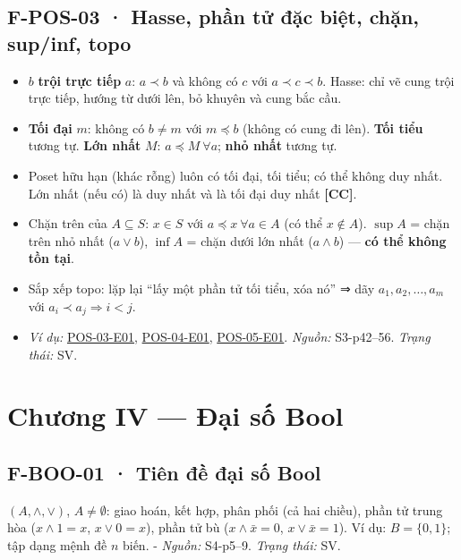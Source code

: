 \documentclass[
  10pt,
  twoside,openany]{book}
\providecommand{\tightlist}{%
  \setlength{\itemsep}{0pt}\setlength{\parskip}{0pt}}
\begin{document}
\hypertarget{F-POS-03}{%
\subsection{F-POS-03 · Hasse, phần tử đặc biệt, chặn, sup/inf,
topo}\label{F-POS-03}}

\begin{itemize}
\tightlist
\item
  \(b\) \textbf{trội trực tiếp} \(a\): \(a\prec b\) và không có \(c\)
  với \(a\prec c\prec b\). Hasse: chỉ vẽ cung trội trực tiếp, hướng từ
  dưới lên, bỏ khuyên và cung bắc cầu.
\item
  \textbf{Tối đại} \(m\): không có \(b\ne m\) với \(m\preceq b\) (không
  có cung đi lên). \textbf{Tối tiểu} tương tự. \textbf{Lớn nhất} \(M\):
  \(a\preceq M\ \forall a\); \textbf{nhỏ nhất} tương tự.
\item
  Poset hữu hạn (khác rỗng) luôn có tối đại, tối tiểu; có thể không duy
  nhất. Lớn nhất (nếu có) là duy nhất và là tối đại duy nhất
  \textbf{{[}CC{]}}.
\item
  Chặn trên của \(A\subseteq S\): \(x\in S\) với
  \(a\preceq x\ \forall a\in A\) (có thể \(x\notin A\)). \(\sup A\) =
  chặn trên nhỏ nhất (\(a\vee b\)), \(\inf A\) = chặn dưới lớn nhất
  (\(a\wedge b\)) --- \textbf{có thể không tồn tại}.
\item
  Sắp xếp topo: lặp lại ``lấy một phần tử tối tiểu, xóa nó'' ⇒ dãy
  \(a_1,a_2,\dots,a_m\) với \(a_i\prec a_j\Rightarrow i<j\).
\item
  \emph{Ví dụ:} \protect\hyperlink{POS-03-E01}{POS-03-E01},
  \protect\hyperlink{POS-04-E01}{POS-04-E01},
  \protect\hyperlink{POS-05-E01}{POS-05-E01}. \emph{Nguồn:} S3-p42--56.
  \emph{Trạng thái:} SV.
\end{itemize}

\hypertarget{chux1b0ux1a1ng-iv-ux111ux1ea1i-sux1ed1-bool-1}{%
\section{Chương IV --- Đại số
Bool}\label{chux1b0ux1a1ng-iv-ux111ux1ea1i-sux1ed1-bool-1}}

\hypertarget{F-BOO-01}{%
\subsection{F-BOO-01 · Tiên đề đại số Bool}\label{F-BOO-01}}

\((A,\wedge,\vee)\), \(A\ne\emptyset\): giao hoán, kết hợp, phân phối
(cả hai chiều), phần tử trung hòa (\(x\wedge1=x\), \(x\vee0=x\)), phần
tử bù (\(x\wedge\bar x=0\), \(x\vee\bar x=1\)). Ví dụ: \(B=\{0,1\}\);
tập dạng mệnh đề \(n\) biến. - \emph{Nguồn:} S4-p5--9. \emph{Trạng
thái:} SV.
\end{document}
